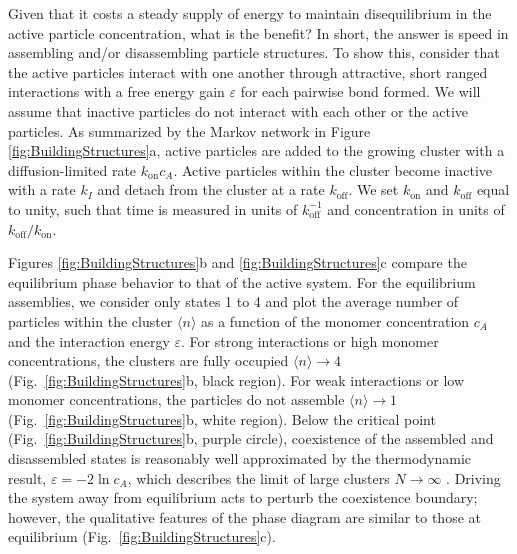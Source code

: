 \begin{appendices}
Given that it costs a steady supply of energy to maintain disequilibrium in the active particle concentration, what is the benefit? In short, the answer is speed in assembling and/or disassembling particle structures. To show this, consider that the active particles interact with one another through attractive, short ranged interactions with a free energy gain $\varepsilon$ for each pairwise bond formed. We will assume that inactive particles do not interact with each other or the active particles. As summarized by the Markov network in Figure \ref{fig:BuildingStructures}a, active particles are added to the growing cluster with a diffusion-limited rate $k_{\text{on}} c_A$.  Active particles within the cluster become inactive with a rate $k_I$ and detach from the cluster at a rate $k_{\text{off}}$.  We set $k_{\text{on}}$ and $k_{\text{off}}$ equal to unity, such that time is measured in units of $k^{-1}_{\text{off}}$ and concentration in units of $k_{\text{off}}/k_{\text{on}}$.

Figures \ref{fig:BuildingStructures}b and \ref{fig:BuildingStructures}c compare the equilibrium phase behavior to that of the active system.  For the equilibrium assemblies, we consider only states 1 to 4 and plot the average number of particles within the cluster $\langle n\rangle$ as a function of the monomer concentration $c_A$ and the interaction energy $\varepsilon$.  For strong interactions or high monomer concentrations, the clusters are fully occupied $\langle n\rangle\rightarrow 4$ (Fig.~\ref{fig:BuildingStructures}b, black region).  For weak interactions or low monomer concentrations, the particles do not assemble $\langle n\rangle \rightarrow 1$ (Fig.~\ref{fig:BuildingStructures}b, white region).  Below the critical point (Fig.~\ref{fig:BuildingStructures}b, purple circle), coexistence of the assembled and disassembled states is reasonably well approximated by the thermodynamic result, $\varepsilon = -2\ln c_A$, which describes the limit of large clusters $N\rightarrow\infty$ \autocite{marsland2018active}.  Driving the system away from equilibrium acts to perturb the coexistence boundary; however, the qualitative features of the phase diagram are similar to those at equilibrium (Fig.~\ref{fig:BuildingStructures}c). 


\end{appendices}

